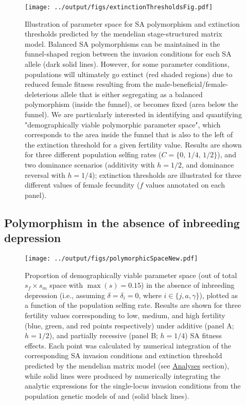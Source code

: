 \documentclass[11pt]{article}
\begin{document}
 \begin{figure}[htbp]
 \centering
 \texttt{[image: ../output/figs/extinctionThresholdsFig.pdf]}
 \caption{\footnotesize{Illustration of parameter space for SA polymorphism and extinction thresholds predicted by the mendelian stage-structured matrix model. Balanced SA polymorphisms can be maintained in the funnel-shaped region between the invasion conditions for each SA allele (dark solid lines). However, for some parameter conditions, populations will ultimately go extinct (red shaded regions) due to reduced female fitness resulting from the male-beneficial/female-deleterious allele that is either segregating as a balanced polymorphism (inside the funnel), or becomes fixed (area below the funnel). We are particularly interested in identifying and quantifying "demographically viable polymorphic parameter space", which corresponds to the area inside the funnel that is also to the left of the extinction threshold for a given fertility value. Results are shown for three different population selfing rates ($C = \{0,\,1/4,\,1/2\}$), and two dominance scenarios (additivity with $h = 1/2$, and dominance reversal with $h = 1/4$); extinction thresholds are illustrated for three different values of female fecundity ($f$ values annotated on each panel).}}
 \label{fig:extThresholds}
 \end{figure}




\subsection*{Polymorphism in the absence of inbreeding depression} \label{sec:Res:PolyNoID}

 \begin{figure}[htbp]
 \centering
 \texttt{[image: ../output/figs/polymorphicSpaceNew.pdf]}
 \caption{\footnotesize{Proportion of demographically viable parameter space (out of total $s_f \times s_m$ space with $\max(s) = 0.15$) in the absence of inbreeding depression (i.e., assuming $\delta = \delta_i = 0$, where $i \in \{j,a,\gamma\}$), plotted as a function of the population selfing rate. Results are shown for three fertility values corresponding to low, medium, and high fertility (blue, green, and red points respectively) under additive (panel A; $h = 1/2$), and partially recessive (panel B; $h = 1/4$) SA fitness effects. Each point was calculated by numerical integration of the corresponding SA invasion conditions and extinction threshold predicted by the mendelian matrix model (see \hyperref[sec:analyses]{Analyses} section), while solid lines were produced by numerically integrating the analytic expressions for the single-locus invasion conditions from the population genetic models of \citet{JordanConnallon2014} and \citet{Olito2017} (solid black lines).}} 
 \label{fig:polySpace}
 \end{figure}
\end{document}
